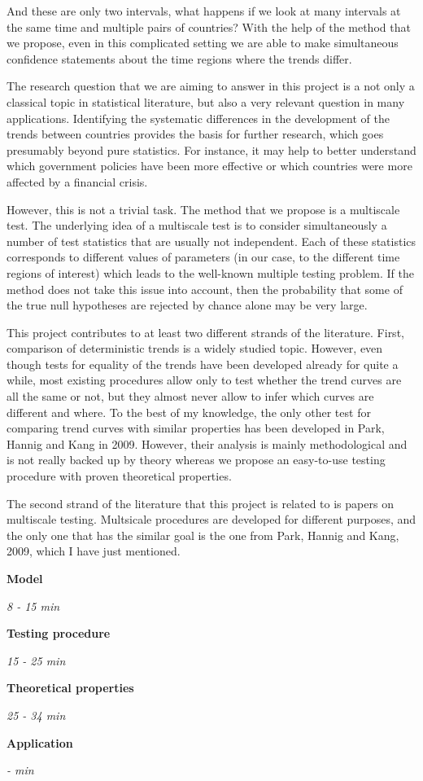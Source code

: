 \documentclass[a4paper,12pt]{article}
\begin{document}
And these are only two intervals, what happens if we look at many intervals at the same time and multiple pairs of countries? With the help of the method that we propose, even in this complicated setting we are able to make simultaneous confidence statements about the time regions where the trends differ.

The research question that we are aiming to answer in this project is a not only a classical topic in statistical literature, but also a very relevant question in many applications. Identifying the systematic differences in the development of the trends between countries provides the basis for further research, which goes presumably beyond pure statistics. For instance, it may help to better understand which government policies have been more effective or which countries were more affected by a financial crisis.

However, this is not a trivial task. The method that we propose is a multiscale test. The underlying idea of a multiscale test is to consider simultaneously a number of test statistics that are usually not independent. Each of these statistics corresponds to different values of parameters (in our case, to the different time regions of interest) which leads to the well-known multiple testing problem. If the method does not take this issue into account, then the probability that some of the true null hypotheses are rejected by chance alone may be very large.

This project contributes to at least two different strands of the literature. First, comparison of deterministic trends is a widely studied topic. However, even though tests for equality of the trends have been developed already for quite a while, most existing procedures allow only to test whether the trend curves are all the same or not, but they almost never allow to infer which curves are different and where. To the best of my knowledge, the only other test for comparing trend curves with similar properties has been developed in Park, Hannig and Kang in 2009. However, their analysis is mainly methodological and is not really backed up by theory whereas we propose an easy-to-use testing procedure with proven theoretical properties.

The second strand of the literature that this project is related to is papers on multiscale testing. Multsicale procedures are developed for different purposes, and the only one that has the similar goal is the one from Park, Hannig and Kang, 2009, which I have just mentioned.

\textbf{Model}

\emph{8 -  15 min}

\textbf{Testing procedure}

\emph{15 - 25 min}

\textbf{Theoretical properties}

\emph{ 25 - 34 min}

\textbf{Application}

 \emph{ -  min}
\end{document}
